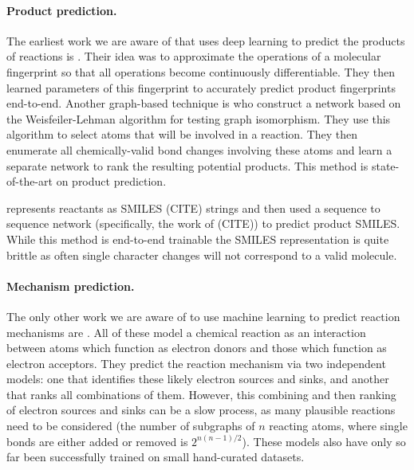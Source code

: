 \paragraph{Product prediction.}
The earliest work we are aware of that uses deep learning to predict the products of reactions is \cite{wei2016neural}. Their idea was to approximate the operations of a molecular fingerprint so that all operations become continuously differentiable. They then learned parameters of this fingerprint to accurately predict product fingerprints end-to-end.
Another graph-based technique is \cite{jin2017predicting} who construct a network based on the Weisfeiler-Lehman algorithm for testing graph isomorphism. They use this algorithm to select atoms that will be involved in a reaction. They then enumerate all chemically-valid bond changes involving these atoms and learn a separate network to rank the resulting potential products. This method is state-of-the-art on product prediction.

\cite{schwaller2017found} represents reactants as SMILES (CITE) strings and then used a sequence to sequence network (specifically, the work of (CITE)) to predict product SMILES. While this method is end-to-end trainable the SMILES representation is quite brittle as often single character changes will not correspond to a valid molecule.

\paragraph{Mechanism prediction.}
The only other work we are aware of to use machine learning to predict reaction mechanisms are \cite{fooshee2018deep,kayala2012reactionpredictor,NIPS2011_4356,kayala2011learning}.
All of these model a chemical reaction as an interaction between atoms which function as electron donors and those which function as electron acceptors. They predict the reaction mechanism via two independent models: one that identifies these likely electron sources and sinks, and another that ranks all combinations of them.
However, this combining and then ranking of electron sources and sinks can be a slow process, as many plausible reactions need to be considered (the number of subgraphs of $n$ reacting atoms, where single bonds are either added or removed is $2^{n(n-1)/2}$).
These models also have only so far been successfully trained on small hand-curated datasets.


